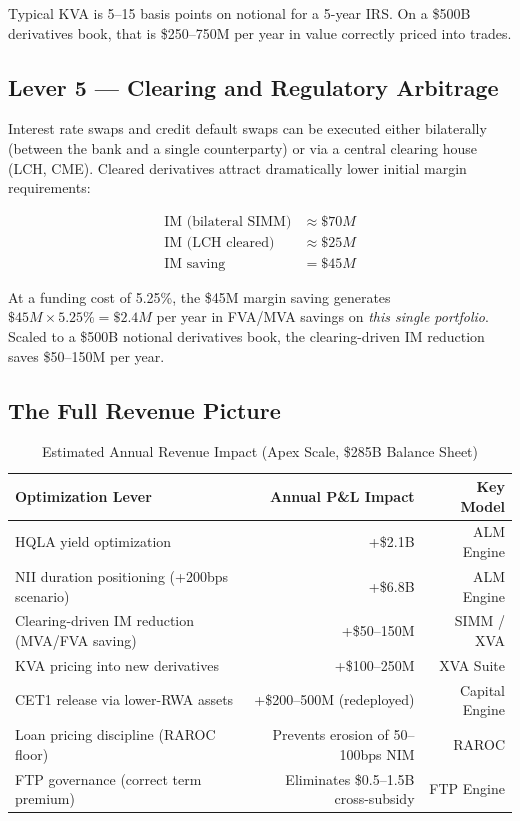 \documentclass[12pt,a4paper]{article}
\begin{document}
Typical KVA is 5--15 basis points on notional for a 5-year IRS.
On a \$500B derivatives book, that is \$250--750M per year in value
correctly priced into trades.

\subsection{Lever 5 --- Clearing and Regulatory Arbitrage}

Interest rate swaps and credit default swaps can be executed either
bilaterally (between the bank and a single counterparty) or via a central
clearing house (LCH, CME).  Cleared derivatives attract dramatically lower
initial margin requirements:

\begin{align}
  \text{IM (bilateral SIMM)} &\approx \$70M \\
  \text{IM (LCH cleared)} &\approx \$25M \\
  \text{IM saving} &= \$45M
\end{align}

At a funding cost of 5.25\%, the \$45M margin saving generates
$\$45M \times 5.25\% = \$2.4M$ per year in FVA/MVA savings on \emph{this
single portfolio}.  Scaled to a \$500B notional derivatives book, the
clearing-driven IM reduction saves \$50--150M per year.

\subsection{The Full Revenue Picture}

\begin{table}[H]
  \centering
  \caption{Estimated Annual Revenue Impact (Apex Scale, \$285B Balance Sheet)}
  \begin{tabular}{lrr}
    \toprule
    Optimization Lever & Annual P\&L Impact & Key Model \\
    \midrule
    HQLA yield optimization & +\$2.1B & ALM Engine \\
    NII duration positioning (+200bps scenario) & +\$6.8B & ALM Engine \\
    Clearing-driven IM reduction (MVA/FVA saving) & +\$50--150M & SIMM / XVA \\
    KVA pricing into new derivatives & +\$100--250M & XVA Suite \\
    CET1 release via lower-RWA assets & +\$200--500M (redeployed) & Capital Engine \\
    Loan pricing discipline (RAROC floor) & Prevents erosion of 50--100bps NIM & RAROC \\
    FTP governance (correct term premium) & Eliminates \$0.5--1.5B cross-subsidy & FTP Engine \\
    \bottomrule
  \end{tabular}
\end{table}
\end{document}
